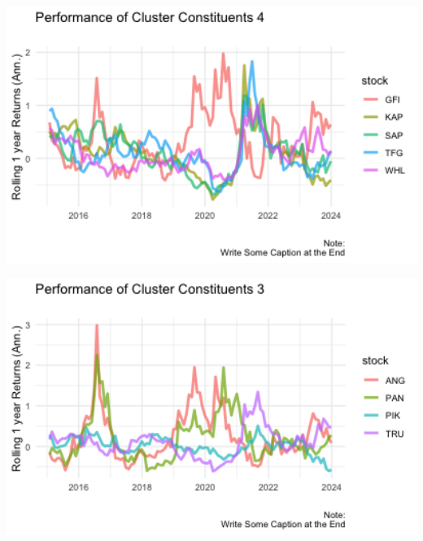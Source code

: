 \documentclass[11pt,preprint, authoryear]{elsarticle}
\let\origfigure\figure
\let\endorigfigure\endfigure
\renewenvironment{figure}[1][2] {
    \expandafter\origfigure\expandafter[H]
} {
    \endorigfigure
}
\numberwithin{equation}{section}
\numberwithin{figure}{section}
\numberwithin{table}{section}
\begin{document}
\begin{figure}[H]

\includegraphics[width=5.56in]{images/returnplots_4} \hfill{}

\caption{ Clusters Results from Highest Silhoutte \label{fig2}}\label{fig:unnamed-chunk-5-3}
\end{figure}
\begin{figure}[H]

\includegraphics[width=5.56in]{images/returnplots_3} \hfill{}

\caption{ Clusters Results from Highest Silhoutte \label{fig2}}\label{fig:unnamed-chunk-5-4}
\end{figure}
\end{document}
